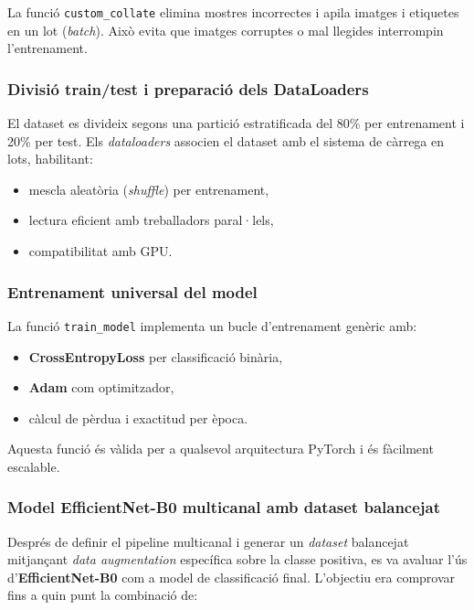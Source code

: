 \documentclass[12pt,a4paper]{article}
\begin{document}
La funció \texttt{custom\_collate} elimina mostres incorrectes i apila imatges i etiquetes
en un lot (\textit{batch}). Això evita que imatges corruptes o mal llegides interrompin
l’entrenament.

\subsubsection{Divisió train/test i preparació dels DataLoaders}

El dataset es divideix segons una partició estratificada del 80\% per entrenament i 20\%
per test. Els \textit{dataloaders} associen el dataset amb el sistema de càrrega en
lots, habilitant:

\begin{itemize}
    \item mescla aleatòria (\textit{shuffle}) per entrenament,
    \item lectura eficient amb treballadors paral·lels,
    \item compatibilitat amb GPU.
\end{itemize}

\subsubsection{Entrenament universal del model}

La funció \texttt{train\_model} implementa un bucle d’entrenament genèric amb:

\begin{itemize}
    \item \textbf{CrossEntropyLoss} per classificació binària,
    \item \textbf{Adam} com optimitzador,
    \item càlcul de pèrdua i exactitud per època.
\end{itemize}

Aquesta funció és vàlida per a qualsevol arquitectura PyTorch i és fàcilment escalable.

\subsubsection{Model EfficientNet-B0 multicanal amb dataset balancejat}

Després de definir el pipeline multicanal i generar un \textit{dataset} balancejat mitjançant
\textit{data augmentation} específica sobre la classe positiva, es va avaluar l’ús
d’\textbf{EfficientNet-B0} com a model de classificació final. L’objectiu era comprovar fins a quin punt
la combinació de:
\end{document}

